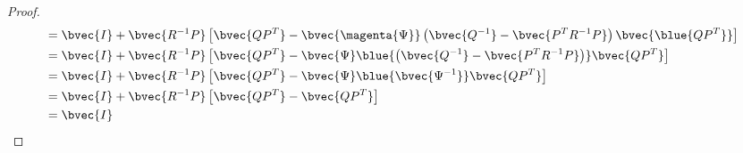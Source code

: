 \begin{lem}
\begin{proof}
\begin{equation}
\begin{aligned}
    &= \bvec{I} + \bvec{R^{-1} P} \left[\bvec{Q P^T} - \bvec{\magenta{\Psi}} \left(\bvec{ Q^{-1}} - \bvec{P^T R^{-1} P}\right)\bvec{\blue{Q P^T}}\right]\\
    &= \bvec{I} + \bvec{R^{-1} P} \left[\bvec{Q P^T} - \bvec{\Psi} \blue{\left(\bvec{ Q^{-1}} - \bvec{P^T R^{-1} P}\right)}\bvec{Q P^T}\right]\\
    &= \bvec{I} + \bvec{R^{-1} P} \left[\bvec{Q P^T} - \bvec{\Psi} \blue{\bvec{\Psi^{-1}}}\bvec{Q P^T}\right]\\
    &= \bvec{I} + \bvec{R^{-1} P} \left[\bvec{Q P^T} - \bvec{Q P^T}\right]\\
    &= \bvec{I} 
\end{aligned}
\end{equation}

\end{proof}
\label{lem:inversion-lemma}

\end{lem}